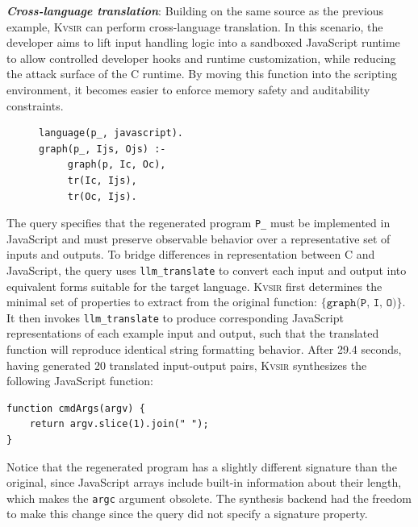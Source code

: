 \documentclass[sigplan,review,anonymous,10pt]{acmart}
\newcommand{\sys}{{\scshape Kv{\textalpha}sir}\xspace}
\newcommand{\heading}[1]{\vspace{2pt}\noindent\textbf{\emph{#1}}:\enspace}
\newcommand{\ttt}[1]{\texttt{#1}\xspace}
\begin{document}
\heading{Cross-language translation}
Building on the same source as the previous example, \sys can perform
cross-language translation.
In this scenario, the developer aims to lift input
handling logic into a sandboxed JavaScript runtime to allow controlled
developer hooks and runtime customization, while reducing the attack surface of
the C runtime.
By moving this function into the scripting environment, it
becomes easier to enforce memory safety and auditability constraints.

\begin{figure}
\begin{verbatim}
language(p_, javascript).
graph(p_, Ijs, Ojs) :-
     graph(p, Ic, Oc),
     tr(Ic, Ijs),
     tr(Oc, Ijs).
\end{verbatim}
\end{figure}
The query specifies that the regenerated program \texttt{P\_} must be
implemented in JavaScript and must preserve observable behavior over a
representative set of inputs and outputs.
To bridge differences in
representation between C and JavaScript, the query uses \texttt{llm\_translate}
to convert each input and output into equivalent forms suitable for the target language.
\sys first determines the minimal set of properties to extract from the
original function: $\{\texttt{graph(P, I, O)}\}$.
It then invokes \texttt{llm\_translate} to produce
corresponding JavaScript representations of each example input and output, such
that the translated function will reproduce identical string formatting
behavior.
After 29.4 seconds, having generated 20 translated input-output pairs, \sys synthesizes the following JavaScript function:

\begin{verbatim}
function cmdArgs(argv) {
    return argv.slice(1).join(" ");
}
\end{verbatim}
Notice that the regenerated program has a slightly different signature than the original, 
since JavaScript arrays include built-in information about their length,
which makes the \ttt{argc} argument obsolete.
The synthesis backend had the freedom to make this change since the query did not specify a signature property.
\end{document}
